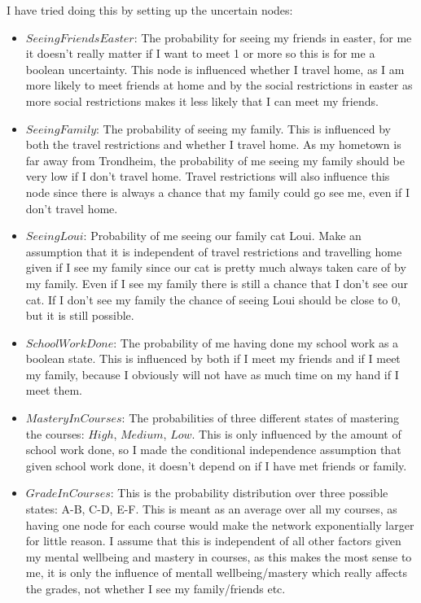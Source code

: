\documentclass[11pt, a4paper, english]{../Template/NTNUoving}
\begin{document}
\begin{oppgave}
    I have tried doing this by setting up the uncertain nodes:
    \begin{itemize}
        \item $SeeingFriendsEaster$: The probability for seeing my friends in easter, for me it doesn't really matter if I want to meet 1
        or more so this is for me a boolean uncertainty. This node is influenced whether I travel home, as I am more likely to meet friends at home and by the
        social restrictions in easter as more social restrictions makes it less likely that I can meet my friends.
        \item $SeeingFamily$: The probability of seeing my family. This is influenced by both the travel restrictions and whether I travel home.
        As my hometown is far away from Trondheim, the probability of me seeing my family should be very low if I don't travel home. Travel restrictions will also influence this node since there
        is always a chance that my family could go see me, even if I don't travel home.
        \item $SeeingLoui$: Probability of me seeing our family cat Loui. Make an assumption that it is independent of travel restrictions and travelling home given if I see my family since our cat is pretty much always taken care of by my family.
        Even if I see my family there is still a chance that I don't see our cat. If I don't see my family the chance of seeing Loui should be close to 0, but it is still possible.
        \item $SchoolWorkDone$: The probability of me having done my school work as a boolean state. This is influenced by both if I meet my friends and if I meet my family, because I obviously
        will not have as much time on my hand if I meet them.
        \item $MasteryInCourses$: The probabilities of three different states of mastering the courses: $High$, $Medium$, $Low$. This is only influenced by the amount of school work done, so I made the conditional independence assumption
        that given school work done, it doesn't depend on if I have met friends or family.
        \item $GradeInCourses$: This is the probability distribution over three possible states: A-B, C-D, E-F. This is meant as an average over all my courses, as having one node for each course would make the network exponentially larger for little reason. I assume that this is independent of all other factors given my mental wellbeing and mastery in courses,
        as this makes the most sense to me, it is only the influence of mentall wellbeing/mastery which really affects the grades, not whether I see my family/friends etc.

\end{itemize}
\end{oppgave}
\end{document}

